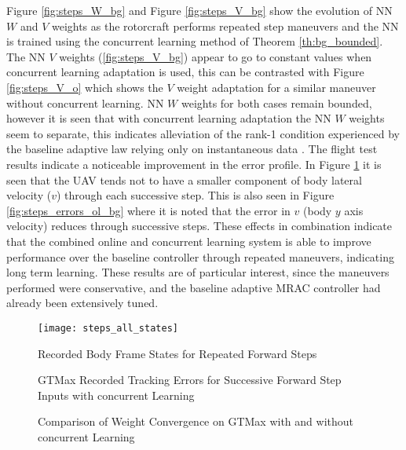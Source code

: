 Figure \ref{fig:steps_W_bg} and Figure \ref{fig:steps_V_bg} show the evolution of NN $W$ and $V$ weights as the rotorcraft performs repeated step maneuvers and the NN is trained using the concurrent learning method of Theorem \ref{th:bg_bounded}. The NN $V$ weights (\ref{fig:steps_V_bg}) appear to go to constant values when concurrent learning adaptation is used, this can be contrasted with Figure \ref{fig:steps_V_o} which shows the $V$ weight adaptation for a similar maneuver without concurrent learning. NN $W$ weights for both cases remain bounded, however it is seen that with concurrent learning adaptation the NN $W$ weights seem to separate, this indicates alleviation of the rank-1 condition experienced by the baseline adaptive law relying only on instantaneous data \cite{Chowdhary:JGCD:10}. The flight test results indicate a noticeable improvement in the error profile. In Figure \ref{fig:steps_all_states} it is seen that the UAV tends not to have a smaller component of body lateral velocity ($v$) through each successive step. This is also seen in Figure \ref{fig:steps_errors_ol_bg}  where it is noted that the error in $v$ (body $y$ axis velocity) reduces through successive steps.  These effects in combination indicate that the combined online and concurrent learning system is able to improve performance over the baseline controller through repeated maneuvers, indicating long term learning.  These results are of particular interest, since the maneuvers performed were conservative, and the baseline adaptive MRAC controller had already been extensively tuned.



\begin{figure}[h]
\centering
\texttt{[image: steps\_all\_states]}
\caption{Recorded Body Frame States for Repeated Forward Steps}
\label{fig:steps_all_states}
\end{figure}

\begin{figure}[h]
\centering
{}
\caption{GTMax Recorded Tracking Errors for Successive Forward Step Inputs with concurrent Learning}
\label{fig:steps_errors}
\end{figure}


\begin{figure}[h]
\centering
{}
\caption{Comparison of Weight Convergence on GTMax with and without concurrent Learning}
\label{fig:steps_weights}
\end{figure}
